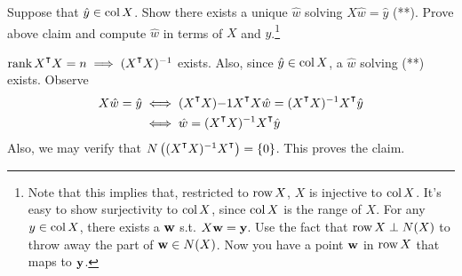 %
\begin{exercise} \label{exer:restricted-bijection}
Suppose that $\hat y \in \text{col}\, X$. Show there exists a unique $\hat w$ solving $X\hat w = \hat y$ (**). 
Prove above claim and compute $\hat w$ in terms of $X$ and $y$.\footnote{Note that this implies that, restricted to $\text{row}\, X$, $X$ is injective to $\text{col}\, X$. It's easy to show surjectivity to $\text{col}\, X$, since $\text{col}\, X$ is the range of $X$. For any $y\in \text{col}\, X$, there exists a ${ \bf w}$ s.t. $X{ \bf w} = {\bf y}$. Use the fact that $\text{row}\, X \perp N(X)$ to throw away the part of ${ \bf w}\in N(X)$. Now you have a point ${ \bf w}$ in $\text{row}\, X$ that maps to ${\bf y}$.}
\end{exercise}

\begin{solution}
 $\myrank X^\T X = n \implies (X^\T X)^{-1}$ exists. Also, since $\hat y\in \text{col}\, X$, a $\hat w$ solving (**) exists. Observe
 \begin{align}
 X \hat w = \hat y & \iff (X^\T X){-1} X^\T X\hat w = (X^\T X)^{-1} X^\T \hat y\\
 & \iff \hat w = (X^\T X)^{-1} X^\T \hat y
 \end{align}
 Also, we may verify that $N\left((X^\T X)^{-1} X^\T\right) = \{0\}$. This proves the claim. 
\end{solution}